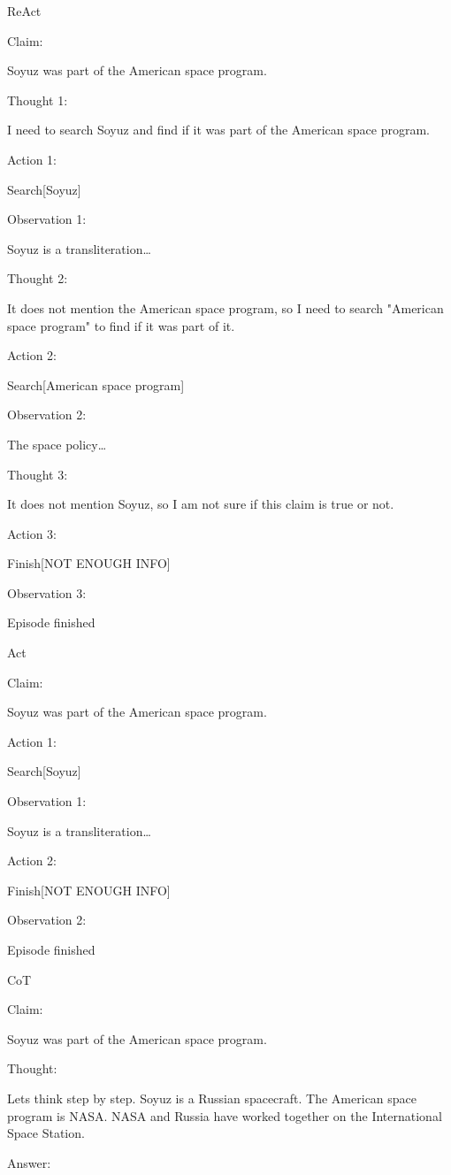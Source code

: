 \documentclass[
]{article}
\begin{document}
ReAct

Claim:

Soyuz was part of the American space program.

Thought 1:

I need to search Soyuz and find if it was part of the American space
program.

Action 1:

Search{[}Soyuz{]}

Observation 1:

Soyuz is a transliteration\ldots{}

Thought 2:

It does not mention the American space program, so I need to search
"American space program" to find if it was part of it.

Action 2:

Search{[}American space program{]}

Observation 2:

The space policy\ldots{}

Thought 3:

It does not mention Soyuz, so I am not sure if this claim is true or
not.

Action 3:

Finish{[}NOT ENOUGH INFO{]}

Observation 3:

Episode finished

Act

Claim:

Soyuz was part of the American space program.

Action 1:

Search{[}Soyuz{]}

Observation 1:

Soyuz is a transliteration\ldots{}

Action 2:

Finish{[}NOT ENOUGH INFO{]}

Observation 2:

Episode finished

CoT

Claim:

Soyuz was part of the American space program.

Thought:

Let\textquotesingle s think step by step. Soyuz is a Russian spacecraft.
The American space program is NASA. NASA and Russia have worked together
on the International Space Station.

Answer:
\end{document}
